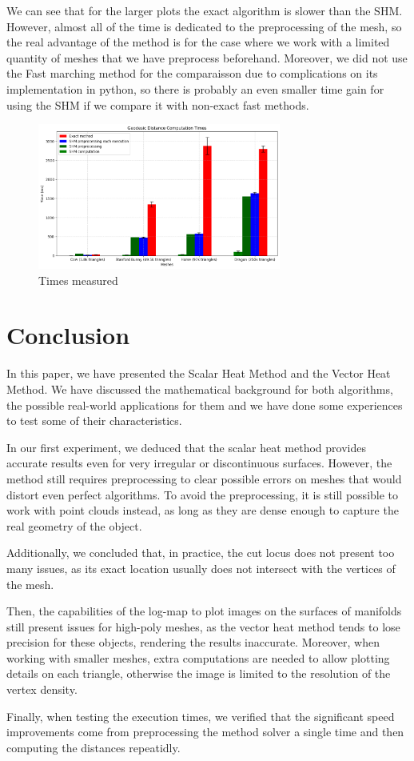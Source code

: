 \documentclass[sigconf, nonacm]{acmart}
\begin{document}
We can see that for the larger plots the exact algorithm is slower than the SHM. 
However, almost all of the time is dedicated to the preprocessing of the mesh, 
so the real advantage of the method is for the case where we work with a limited
quantity of meshes that we have preprocess beforehand. Moreover, we did not
use the Fast marching method for the comparaisson due to complications on its
implementation in python, so there is probably an even smaller time gain for using
the SHM if we compare it with non-exact fast methods.

\begin{figure}
  \centering
  \includegraphics[width=8cm]{time_graphs.png}
  \caption{Times measured}
  \label{fig:time_graphs}
\end{figure}

\section{Conclusion}

In this paper, we have presented the Scalar Heat Method and the Vector Heat Method. We have discussed the mathematical background for both algorithms, the possible real-world applications for them and we have done some experiences to test some of their characteristics.

In our first experiment, we deduced that the scalar heat method provides accurate results even for very irregular or discontinuous surfaces. However, the method still requires preprocessing to clear possible errors on meshes that would distort even perfect algorithms. To avoid the preprocessing, it is still possible to work with point clouds instead, as long as they are dense enough to capture the real geometry of the object.

Additionally, we concluded that, in practice, the cut locus does not present too many issues, as its exact location usually does not intersect with the vertices of the mesh.

Then, the capabilities of the log-map to plot images on the surfaces of manifolds still present issues for high-poly meshes, as the vector heat method tends to lose precision for these objects, rendering the results inaccurate. Moreover, when working with smaller meshes, extra computations are needed to allow plotting details on each triangle, otherwise the image is limited to the resolution of the vertex density.

Finally, when testing the execution times, we verified that the significant speed improvements come from preprocessing the method solver a single time and then computing the distances repeatidly. 



\end{document}
